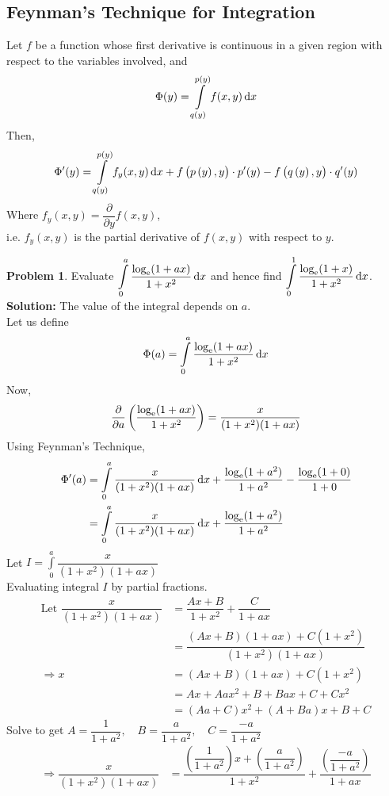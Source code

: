 \documentclass[14]{article}
\theoremstyle{definition}
\newtheorem{prob}{Problem}
\theoremstyle{case}
\begin{document}
\subsection{Feynman's Technique for Integration}
Let $f$ be a function whose first derivative is continuous in a given region with respect to the variables involved, and
\[\Phi(y) = \int\limits_{q(y)}^{p(y)} f(x,y) \dif x\]
Then,
\[\Phi'(y) = \int\limits_{q(y)}^{p(y)} f_y(x, y) \dif x + f\left(p\left( y\right), y\right) \cdot p'(y) - f\left(q\left(y\right), y \right) \cdot q'(y)\]
Where $f_y(x, y) = \dfrac{\partial}{\partial y} f(x, y)$,\\ i.e. $f_y(x, y)$ is the partial derivative of $f(x, y)$ with respect to $y$.
\begin{prob}
Evaluate $\displaystyle\int\limits_0^a \dfrac{\log_{\rm e}(1+ax)}{1+x^2} \dif x$ and hence find $\displaystyle\int\limits_0^1 \dfrac{\log_{\rm e}(1+x)}{1+x^2} \dif x$.\\
\textbf{Solution:} The value of the integral depends on $a$.\\
Let us define
\[\Phi(a) = \int\limits_0^a \dfrac{\log_{\rm e}(1+ax)}{1+x^2} \dif x\]
Now, \[\dfrac{\partial}{\partial a} \left(\dfrac{\log_{\rm e}(1+ax)}{1+x^2}\right) = \dfrac{x}{(1+x^2)(1+ax)}\]
Using Feynman's Technique,
\begin{align*}
\Phi'(a) &= \int\limits_0^a \dfrac{x}{(1+x^2)(1+ax)} \dif x + \dfrac{\log_{\rm e}(1+a^2)}{1+a^2} - \dfrac{\log_{\rm e}(1 + 0)}{1+0}\\
&= \int\limits_0^a \dfrac{x}{(1+x^2)(1+ax)} \dif x + \dfrac{\log_{\rm e}(1+a^2)}{1+a^2}\\
\end{align*}
Let $I = \displaystyle\int\limits_0^a \dfrac{x}{(1+x^2)(1+ax)}$\\
Evaluating integral $I$ by partial fractions.\\
\begin{align*}
\text{Let } \dfrac{x}{(1+x^2)(1+ax)} &= \dfrac{Ax+B}{1+x^2} + \dfrac{C}{1+ax}\\
&= \dfrac{(Ax+B)(1+ax) + C(1+x^2)}{(1+x^2)(1+ax)}\\
\Rightarrow x &= (Ax + B)(1+ ax) + C(1+x^2)\\
&= Ax + Aax^2 + B + Bax + C + Cx^2\\
&= (Aa + C) x^2 + (A + Ba)x + B + C
\end{align*}
Solve to get $A = \dfrac{1}{1+a^2},\quad B = \dfrac{a}{1+a^2}, \quad C = \dfrac{-a}{1+a^2}$
\pagebreak
\begin{align*}
\Rightarrow \dfrac{x}{(1+x^2)(1+ax)} &= \dfrac{\left( \dfrac{1}{1+a^2} \right)x + \left( \dfrac{a}{1+a^2} \right)}{1+x^2} + \dfrac{\left( \dfrac{-a}{1+a^2} \right)}{1+ax}\\

\end{align*}
\end{prob}
\end{document}
